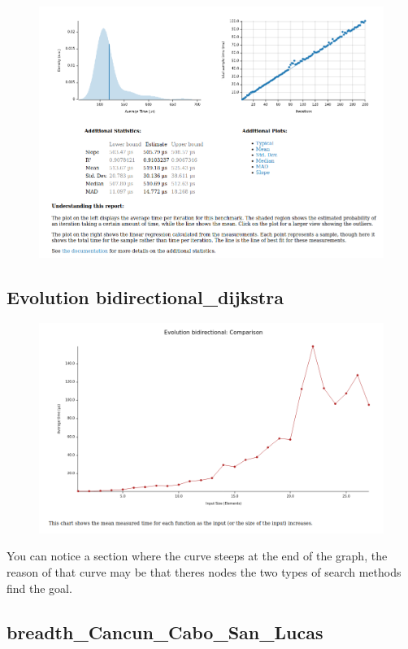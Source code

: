 \begin{figure}[H]
\centering
\includegraphics[scale=0.4]{../img/depth_full}
\end{figure}

\subsection{Evolution bidirectional\_dijkstra}

\begin{figure}[H]
    \centering
    \includegraphics[scale=0.4]{../img/bidirectional}
\end{figure}
You can notice a section where the curve steeps at the end of the graph, the reason of that curve may be that
theres nodes the two types of search methods find the goal.
\subsection{breadth\_Cancun\_Cabo\_San\_Lucas}

